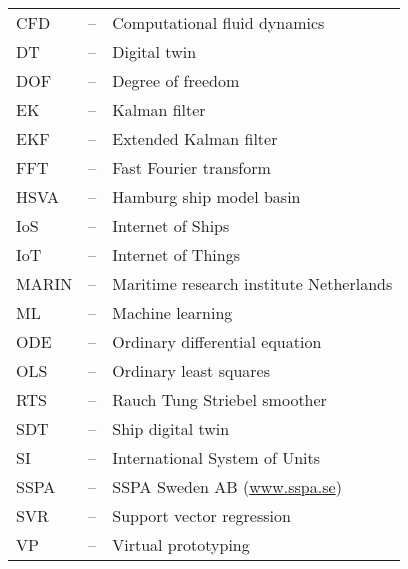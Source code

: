 
\begin{tabular}{ l c l }
CFD & -- & Computational fluid dynamics\\
DT  & -- & Digital twin\\
DOF & -- & Degree of freedom\\
EK & -- & Kalman filter \\
EKF & -- & Extended Kalman filter \\
FFT & -- & Fast Fourier transform\\
HSVA & -- & Hamburg ship model basin \\
IoS & -- & Internet of Ships \\
IoT & -- & Internet of Things \\
MARIN & -- & Maritime research institute Netherlands \\
ML & -- & Machine learning \\
ODE & -- & Ordinary differential equation\\
OLS & -- & Ordinary least squares\\
RTS & -- & Rauch Tung Striebel smoother \\
SDT  & -- & Ship digital twin\\
SI  & -- & International System of Units\\
SSPA & -- & SSPA Sweden AB (\url{www.sspa.se})\\
SVR & -- & Support vector regression \\
VP & -- & Virtual prototyping \\
\end{tabular}
